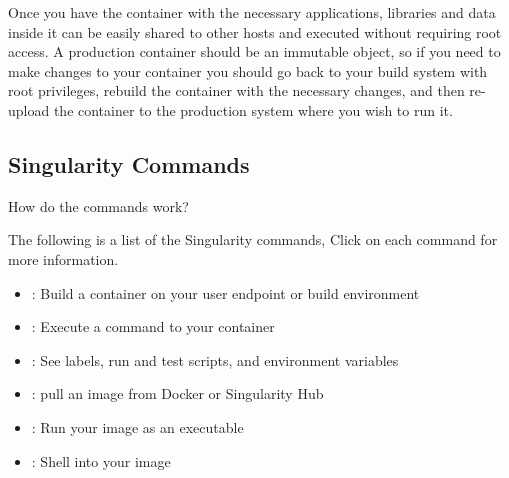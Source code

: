 \documentclass[letterpaper,10pt,english]{sphinxmanual}
\begin{document}
Once you have the container with the necessary applications, libraries
and data inside it can be easily shared to other hosts and executed
without requiring root access. A production container should be an
immutable object, so if you need to make changes to your container you
should go back to your build system with root privileges, rebuild the
container with the necessary changes, and then re-upload the container
to the production system where you wish to run it.


\subsection{Singularity Commands}
\label{\detokenize{introduction:singularity-commands}}
How do the commands work?

The following is a list of the Singularity commands, Click on each command for more information.
\begin{itemize}
\item {} 
{\hyperref[\detokenize{appendix:build-command}]{}} : Build a container on your user endpoint or build environment

\item {} 
{\hyperref[\detokenize{appendix:exec-command}]{}} : Execute a command to your container

\item {} 
{\hyperref[\detokenize{appendix:inspect-command}]{}} : See labels, run and test scripts, and environment variables

\item {} 
{\hyperref[\detokenize{appendix:pull-command}]{}} : pull an image from Docker or Singularity Hub

\item {} 
{\hyperref[\detokenize{appendix:run-command}]{}} : Run your image as an executable

\item {} 
{\hyperref[\detokenize{appendix:shell-command}]{}} : Shell into your image

\end{itemize}
\end{document}
